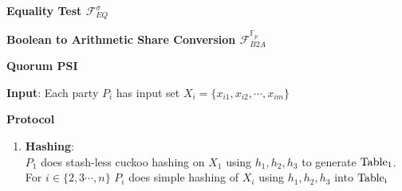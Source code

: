 \begin{frame}

    \centering\textbf{Equality Test $\mathcal{F}_{EQ}^{\sigma}$ }

    \vspace{0.25cm}

    \centering{}

    \vspace{0.5cm}

    \centering\textbf{Boolean to Arithmetic Share Conversion $\mathcal{F}_{B2A}^{\mathbb{F}_p}$}

    \vspace{0.25cm}

    \centering{}
    
    \vspace{0.25cm}



\end{frame}


\begin{frame}

    \textbf{Quorum PSI}

    \vspace{0.5cm}

    \textbf{Input}: Each party $P_i$ has input set $X_i = \{x_{i1},x_{i2},\cdots,x_{im}\}$
    
    \vspace{0.5cm}

    \textbf{Protocol}

    \begin{enumerate}
        \item \textbf{Hashing}:\\ $P_1$ does stash-less cuckoo hashing on $X_1$ using $h_1,h_2,h_3$ to generate $\rm{Table}_1$. \\
        For $i \in \{2,3\cdots,n\}$ $P_i$ does simple hashing of $X_i$ using $h_1,h_2,h_3$ into $\rm{Table}_i$
    \end{enumerate}

\end{frame}


